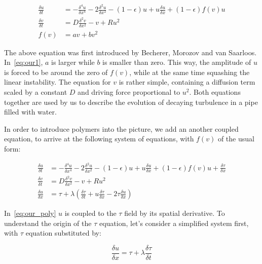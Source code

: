 \documentclass[11pt,a4paper]{article}
\begin{document}
\begin{equation}\label{eq:our1}
    \begin{split}
        \frac{\delta u}{\delta t} &= -\frac{\delta^4u}{\delta x^4} - 2\frac{\delta^2u}{\delta x^2} - (1 - \epsilon)u + u\frac{\delta u}{\delta x} + (1 - \epsilon)f(v)u \\
        \frac{\delta v}{\delta t} &= D\frac{\delta^2 v}{\delta x^2} - v + Ru^2 \\
        f(v) &= av + bv^2
\end{split}
\end{equation}

The above equation was first introduced by Becherer, Morozov and van Saarloos\cite{Morozov09}.
In~\eqref{eq:our1}, $a$ is larger while $b$ is smaller than zero.
This way, the amplitude of $u$ is forced to be around the zero of $f(v)$, while at the same time squashing the linear instability.
The equation for $v$ is rather simple, containing a diffusion term scaled by a constant $D$ and driving force proportional to $u^2$.
Both equations together are used by us to describe the evolution of decaying turbulence in a pipe filled with water.

In order to introduce polymers into the picture, we add an another coupled equation, to arrive at the following system of equations, with $f(v)$ of the usual form:


\begin{equation}\label{eq:our_poly}
    \begin{split}
        \frac{\delta u}{\delta t} &= -\frac{\delta^4u}{\delta x^4} - 2\frac{\delta^2u}{\delta x^2} - (1 - \epsilon)u + u\frac{\delta u}{\delta x} + (1 - \epsilon)f(v)u + \frac{\delta \tau}{\delta x}\\
        \frac{\delta v}{\delta t} &= D\frac{\delta^2 v}{\delta x^2} - v + Ru^2 \\
        \frac{\delta u}{\delta x} &= \tau + \lambda(\frac{\delta \tau}{\delta t} + u\frac{\delta \tau}{\delta x} - 2\tau\frac{\delta u}{\delta x})
\end{split}
\end{equation}

In~\eqref{eq:our_poly} $u$ is coupled to the $\tau$ field by its spatial derivative.
To understand the origin of the $\tau$ equation, let's consider a simplified system first, with $\tau$ equation substituted by:

\begin{equation}\label{eq:poly_simp}
    \frac{\delta u}{\delta x} = \tau + \lambda\frac{\delta \tau}{\delta t} 
\end{equation}
\end{document}
